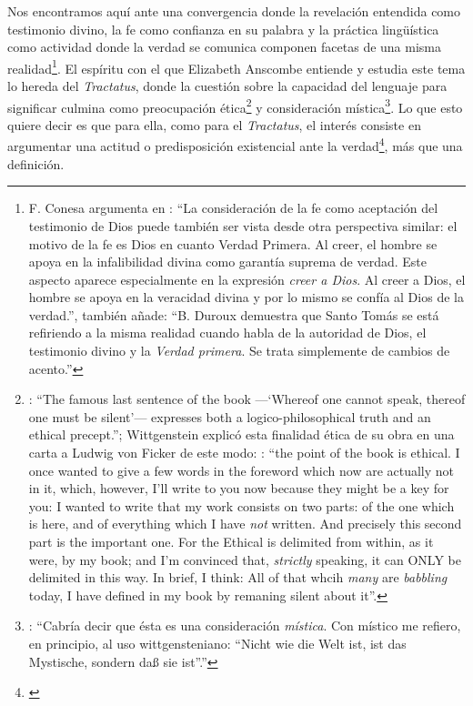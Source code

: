 Nos encontramos aquí ante una convergencia donde la revelación entendida como testimonio divino, la fe como confianza en su palabra y la práctica lingüística como actividad donde la verdad se comunica componen facetas de una misma realidad\footnote{F. Conesa argumenta en \Cite[259]{conesa1994cc}: \enquote{La consideración de la fe como aceptación del testimonio de Dios puede también ser vista desde otra perspectiva similar: el motivo de la fe es Dios en cuanto Verdad Primera. Al creer, el hombre se apoya en la infalibilidad divina como garantía suprema de verdad. Este aspecto aparece especialmente en la expresión \emph{creer a Dios}. Al creer a Dios, el hombre se apoya en la veracidad divina y por lo mismo se confía al Dios de la verdad.}, también añade: \enquote{B. Duroux demuestra que Santo Tomás se está refiriendo a la misma realidad cuando habla de la autoridad de Dios, el testimonio divino y la \emph{Verdad primera}. Se trata simplemente de cambios de acento.}}. El espíritu con el que Elizabeth Anscombe entiende y estudia este tema lo hereda del \emph{Tractatus}, donde la cuestión sobre la capacidad del lenguaje para significar culmina como preocupación ética\footnote{\cite[Cf.][156]{monk1991duty}: \enquote{The famous last sentence of the book ---`Whereof one cannot speak, thereof one must be silent'--- expresses both a logico-philosophical truth and an ethical precept.}; Wittgenstein explicó esta finalidad ética de su obra en una carta a Ludwig von Ficker de este modo: \cite[22-23]{monk2005howto}: \enquote{the point of the book is ethical. I once wanted to give a few words in the foreword which now are actually not in it, which, however, I'll write to you now because they might be a key for you: I wanted to write that my work consists on two parts: of the one which is here, and of everything which I have \emph{not} written. And precisely this second part is the important one. For the Ethical is delimited from within, as it were, by my book; and I'm convinced that, \emph{strictly} speaking, it can ONLY be delimited in this way. In brief, I think: All of that whcih \emph{many} are \emph{babbling} today, I have defined in my book by remaning silent about it}.} y consideración mística\footnote{\Cite[357]{dominguez2009at}: \enquote{Cabría decir que ésta es una consideración \emph{mística}. Con místico me refiero, en principio, al uso wittgensteniano: ``Nicht wie die Welt ist, ist das Mystische, sondern daß sie ist''.}}. Lo que esto quiere decir es que para ella, como para el \emph{Tractatus}, el interés consiste en argumentar una actitud o predisposición existencial ante la verdad\footnote{\Cite[Cf.][354-355]{dominguez2009at}}, más que una definición. 

